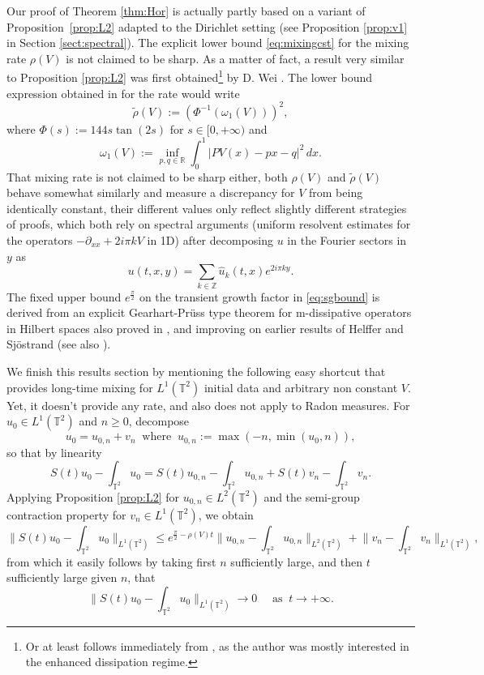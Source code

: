 \documentclass[12pt]{article}
\newcommand{\R}{\mathbb{R}}
\newcommand{\Z}{\mathbb{Z}}
\newcommand{\T}{\mathbb{T}}
\begin{document}
Our proof of Theorem \ref{thm:Hor} is actually partly based on a 
variant of Proposition~\ref{prop:L2} adapted to the Dirichlet 
setting (see Proposition \ref{prop:v1} in Section \ref{sect:spectral}). 
The explicit lower bound \eqref{eq:mixingcst} for the mixing rate $\rho(V)$  
is not claimed to be sharp. As a matter of fact, a result very similar 
to Proposition \ref{prop:L2} was first obtained\footnote{Or at least follows 
immediately from \cite{Wei21}, as the author was mostly interested in 
the enhanced dissipation regime.} by 
D. Wei \cite{Wei21}. The lower bound expression obtained in \cite{Wei21} for the rate
would write   
$$
\tilde \rho(V) := \left(\Phi^{-1}(\omega_1(V))\right)^2, 
$$
where $\Phi(s) := 144s\tan(2s)$ for $s \in [0,+\infty)$ and     
$$
\omega_1(V) := \inf_{p,q \in \R} \int_0^1 \big|PV(x) - px - q\big|^2\, dx.
$$
That mixing rate is not claimed to be sharp either, 
both $\rho(V)$ and $\tilde \rho(V)$ behave somewhat 
similarly and measure a discrepancy for $V$ from 
being identically constant, their different values only reflect
slightly different strategies of proofs, which both rely 
on spectral arguments 
(uniform resolvent estimates for the operators 
$-\partial_{xx} + 2i\pi kV$ in 1D) after 
decomposing $u$ in the Fourier sectors in $y$ as 
$$
u(t, x, y) = \sum_{k \in \Z} \hat u_k(t,x) e^{2i\pi ky}.
$$
The fixed upper bound $e^{\frac{\pi}{2}}$ on the transient growth factor in 
\eqref{eq:sgbound} is derived from an explicit Gearhart-Pr\"uss type 
theorem for m-dissipative operators in Hilbert spaces also proved in 
\cite{Wei21}, and improving on earlier results of Helffer and Sj\"ostrand 
\cite{HelSjo10} (see also \cite{HelSjo21}).

\medskip

We finish this results section by mentioning the following easy shortcut 
that provides long-time mixing for $L^1(\T^2)$ initial data and arbitrary 
non constant $V$. Yet, it doesn't provide any rate, and also does not 
apply to Radon measures. For $u_0 \in L^1(\T^2)$ and $n \geq 0$, 
decompose  
$$
u_0 = u_{0,n} + v_n \ \text{ where } \
u_{0,n} := \max\left(-n, \min\left(u_0, n\right)\right), 
$$
so that by linearity
$$
S(t)u_0 - \int_{\T^2}u_0 = S(t)u_{0,n} - \int_{\T^2}u_{0,n} + S(t)v_n -
\int_{\T^2} v_n.
$$
Applying Proposition \ref{prop:L2} for $u_{0,n} \in L^2(\T^2)$ and the semi-group 
contraction property for $v_n \in L^1(\T^2)$, we obtain
$$
\Big\|S(t)u_0 - \int_{\T^2}u_0\Big\|_{L^1(\T^2)} \leq e^{\frac{\pi}{2} -
\rho(V)t}\Big\|u_{0,n} -
\int_{\T^2} u_{0,n}\Big\|_{L^2(\T^2)} + \Big\|v_n -
\int_{\T^2}v_n\Big\|_{L^1(\T^2)},
$$
from which it easily follows by taking first $n$ sufficiently large, and then
$t$ sufficiently large given $n$, that 
$$
\big\|S(t)u_0 - \int_{\T^2}u_0\big\|_{L^1(\T^2)} \to 0 \quad \text{ as } \ t \to
+\infty.
$$
\end{document}
